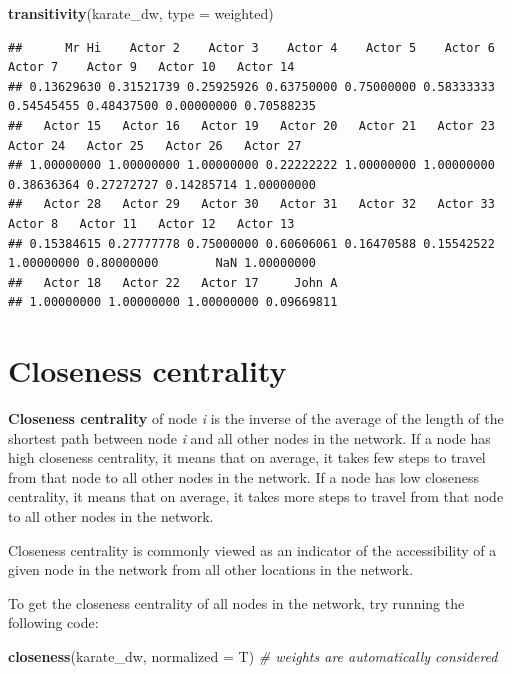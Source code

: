 \documentclass[
]{book}
\newenvironment{Shaded}{\begin{snugshade}}{\end{snugshade}}
\newcommand{\AttributeTok}[1]{\textcolor[rgb]{0.13,0.29,0.53}{#1}}
\newcommand{\CommentTok}[1]{\textcolor[rgb]{0.56,0.35,0.01}{\textit{#1}}}
\newcommand{\FunctionTok}[1]{\textcolor[rgb]{0.13,0.29,0.53}{\textbf{#1}}}
\newcommand{\NormalTok}[1]{#1}
\newcommand{\StringTok}[1]{\textcolor[rgb]{0.31,0.60,0.02}{#1}}
\begin{document}
\begin{Shaded}
\begin{Highlighting}[]
\FunctionTok{transitivity}\NormalTok{(karate\_dw, }\AttributeTok{type =} \StringTok{\textquotesingle{}weighted\textquotesingle{}}\NormalTok{)}
\end{Highlighting}
\end{Shaded}

\begin{verbatim}
##      Mr Hi    Actor 2    Actor 3    Actor 4    Actor 5    Actor 6    Actor 7    Actor 9   Actor 10   Actor 14 
## 0.13629630 0.31521739 0.25925926 0.63750000 0.75000000 0.58333333 0.54545455 0.48437500 0.00000000 0.70588235 
##   Actor 15   Actor 16   Actor 19   Actor 20   Actor 21   Actor 23   Actor 24   Actor 25   Actor 26   Actor 27 
## 1.00000000 1.00000000 1.00000000 0.22222222 1.00000000 1.00000000 0.38636364 0.27272727 0.14285714 1.00000000 
##   Actor 28   Actor 29   Actor 30   Actor 31   Actor 32   Actor 33    Actor 8   Actor 11   Actor 12   Actor 13 
## 0.15384615 0.27777778 0.75000000 0.60606061 0.16470588 0.15542522 1.00000000 0.80000000        NaN 1.00000000 
##   Actor 18   Actor 22   Actor 17     John A 
## 1.00000000 1.00000000 1.00000000 0.09669811
\end{verbatim}

\section{Closeness centrality}\label{closeness-centrality}

\textbf{Closeness centrality} of node \emph{i} is the inverse of the average of the length of the shortest path between node \emph{i} and all other nodes in the network. If a node has high closeness centrality, it means that on average, it takes few steps to travel from that node to all other nodes in the network. If a node has low closeness centrality, it means that on average, it takes more steps to travel from that node to all other nodes in the network.

Closeness centrality is commonly viewed as an indicator of the accessibility of a given node in the network from all other locations in the network.

To get the closeness centrality of all nodes in the network, try running the following code:

\begin{Shaded}
\begin{Highlighting}[]
\FunctionTok{closeness}\NormalTok{(karate\_dw, }\AttributeTok{normalized =}\NormalTok{ T) }\CommentTok{\# weights are automatically considered}
\end{Highlighting}
\end{Shaded}
\end{document}
